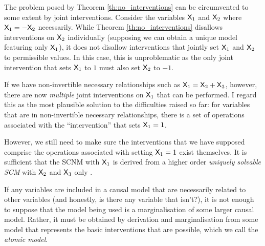 
The problem posed by Theorem \ref{th:no_interventions} can be circumvented to some extent by joint interventions. Consider the variables $\mathsf{X}_1$ and $\mathsf{X}_2$ where $\mathsf{X}_1 = - \mathsf{X}_2$ necessarily. While Theorem \ref{th:no_interventions} disallows interventions on $\mathsf{X}_2$ individually (supposing we can obtain a unique model featuring only $\mathsf{X}_1$), it does not disallow interventions that jointly set $\mathsf{X}_1$ and $\mathsf{X}_2$ to permissible values. In this case, this is unproblematic as the only joint intervention that sets $\mathsf{X}_1$ to $1$ must also set $\mathsf{X}_2$ to $-1$.

If we have non-invertible necessary relationships such as $\mathsf{X}_1 = \mathsf{X}_2 + \mathsf{X}_3$, however, there are now \emph{multiple} joint interventions on $\mathsf{X}_1$ that can be performed. I regard this as the most plausible solution to the difficulties raised so far: for variables that are in non-invertible necessary relationships, there is a set of operations associated with the ``intervention'' that sets $\mathsf{X}_1=1$.

However, we still need to make sure the interventions that we have supposed comprise the operations associated with setting $\mathsf{X}_1=1$ exist themselves. It is sufficient that the SCNM with $\mathsf{X}_1$ is derived from a higher order \emph{uniquely solvable SCM} with $\mathsf{X}_2$ and $\mathsf{X}_3$ only .


If any variables are included in a causal model that are necessarily related to other variables (and honestly, is there any variable that isn't?), it is not enough to suppose that the model being used is a marginalisation of some larger causal model. Rather, it must be obtained by derivation and marginalisation from some model that represents the basic interventions that are possible, which we call the \emph{atomic model}.